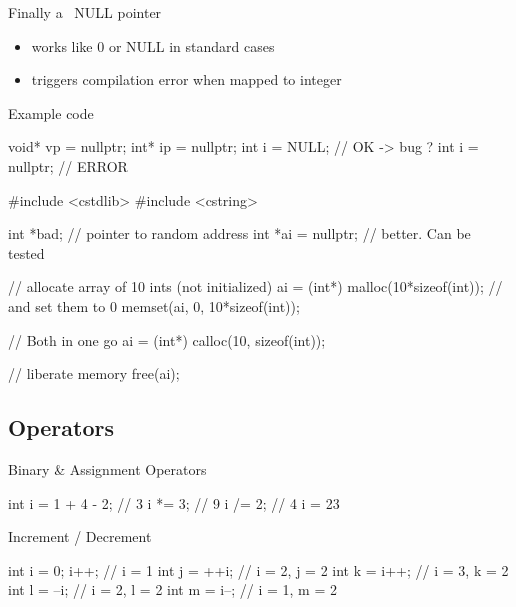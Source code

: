 \begin{frame}[fragile]
  \begin{block}{Finally a \cpp~NULL pointer}
    \begin{itemize}
    \item works like 0 or NULL in standard cases
    \item triggers compilation error when mapped to integer
    \end{itemize}
  \end{block}
  \pause
  \begin{exampleblock}{Example code}
    \begin{cppcode*}{}
      void* vp = nullptr;
      int* ip = nullptr;
      int i = NULL;      // OK -> bug ?
      int i = nullptr;   // ERROR
    \end{cppcode*}
  \end{exampleblock}
\end{frame}

\begin{frame}[fragile]
  \begin{cppcode}
    #include <cstdlib>
    #include <cstring>

    int *bad;          // pointer to random address
    int *ai = nullptr; // better. Can be tested

    // allocate array of 10 ints (not initialized)
    ai = (int*) malloc(10*sizeof(int));
    // and set them to 0
    memset(ai, 0, 10*sizeof(int));

    // Both in one go
    ai = (int*) calloc(10, sizeof(int));

    // liberate memory
    free(ai);
  \end{cppcode}
\end{frame}

\subsection[Op]{Operators}

\begin{frame}[fragile]
  \begin{block}{Binary \& Assignment Operators}
    \begin{cppcode*}{}
      int i = 1 + 4 - 2;  // 3
      i *= 3;             // 9
      i /= 2;             // 4
      i = 23 %
    \end{cppcode*}
  \end{block}
  \pause
  \begin{block}{Increment / Decrement }
    \begin{cppcode*}{}
      int i = 0; i++; // i = 1
      int j = ++i;    // i = 2, j = 2
      int k = i++;    // i = 3, k = 2
      int l = --i;    // i = 2, l = 2
      int m = i--;    // i = 1, m = 2
    \end{cppcode*}
  \end{block}
\end{frame}

